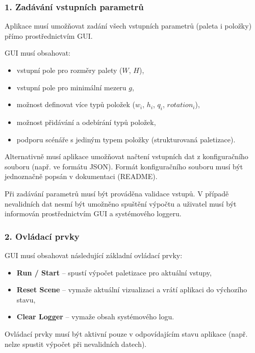 \documentclass[12pt,a4paper]{article}
\begin{document}
\subsubsection*{1. Zadávání vstupních parametrů}

Aplikace musí umožňovat zadání všech vstupních parametrů
(paleta i položky) přímo prostřednictvím GUI.

GUI musí obsahovat:

\begin{itemize}
    \item vstupní pole pro rozměry palety ($W$, $H$),
    \item vstupní pole pro minimální mezeru $g$,
    \item možnost definovat více typů položek ($w_i$, $h_i$, $q_i$, $rotation_i$),
    \item možnost přidávání a odebírání typů položek,
    \item podporu scénáře s jediným typem položky (strukturovaná paletizace).
\end{itemize}

Alternativně musí aplikace umožňovat načtení vstupních dat
z konfiguračního souboru (např. ve formátu JSON).
Formát konfiguračního souboru musí být jednoznačně popsán
v dokumentaci (README).

Při zadávání parametrů musí být prováděna validace vstupů.
V případě nevalidních dat nesmí být umožněno spuštění výpočtu
a uživatel musí být informován prostřednictvím GUI
a systémového loggeru.

\subsubsection*{2. Ovládací prvky}

GUI musí obsahovat následující základní ovládací prvky:

\begin{itemize}
    \item \textbf{Run / Start} – spustí výpočet paletizace pro aktuální vstupy,
    \item \textbf{Reset Scene} – vymaže aktuální vizualizaci a vrátí aplikaci do výchozího stavu,
    \item \textbf{Clear Logger} – vymaže obsah systémového logu.
\end{itemize}

Ovládací prvky musí být aktivní pouze v odpovídajícím stavu aplikace
(např. nelze spustit výpočet při nevalidních datech).
\end{document}
